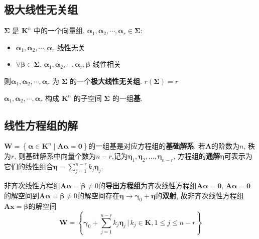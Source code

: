 \documentclass{article}
\begin{document}
		\subsection{极大线性无关组}
			$\boldsymbol{\Sigma}$ 是 $\mathbf{\mathbf{K}}^{n}$ 中的一个向量组, $\boldsymbol{\alpha}_{1}, \boldsymbol{\alpha}_{2}, \cdots, \boldsymbol{\alpha}_{r} \in \boldsymbol{\Sigma}$:
			\begin{itemize}
				\item $\boldsymbol{\alpha}_{1}, \boldsymbol{\alpha}_{2}, \cdots, \boldsymbol{\alpha}_{r}$ 线性无关
				\item $\forall\boldsymbol{\beta} \in \boldsymbol{\Sigma}$, $\boldsymbol{\alpha}_{1}, \boldsymbol{\alpha}_{2}, \cdots, \boldsymbol{\alpha}_{r}, \boldsymbol{\beta}$ 线性相关
			\end{itemize}
			则$\boldsymbol{\alpha}_{1}, \boldsymbol{\alpha}_{2}, \cdots, \boldsymbol{\alpha}_{r}$ 为 $\boldsymbol{\Sigma}$ 的一个\textbf{极大线性无关组}. $r(\boldsymbol{\Sigma})=r$

			$\boldsymbol{\alpha}_{1}, \boldsymbol{\alpha}_{2}, \cdots, \boldsymbol{\alpha}_{r}$ 构成 $\mathbf{\mathbf{K}}^{n}$ 的子空间 $\boldsymbol{\Sigma}$ 的一组\textbf{基}.
		\subsection{线性方程组的解}
			$\boldsymbol W=\left\{\boldsymbol{\alpha} \in \mathbf{\mathbf{K}}^{n} \mid \boldsymbol{A\alpha}=\mathbf{0}\right\}$的一组基是对应方程组的\textbf{基础解系}. 若$\boldsymbol A$的阶数为$n$, 秩为$r$, 则基础解系中向量个数为$n-r$,记为$\boldsymbol\eta _1,\boldsymbol\eta _2,\dots ,\boldsymbol\eta _{n-r}$, 方程组的\textbf{通解}$\boldsymbol\eta$可表示为它们的线性组合$\boldsymbol\eta =\sum \limits _{j=1}^{n-r} k_j\boldsymbol\eta _j$.

			非齐次线性方程组$\boldsymbol{A\alpha}=\boldsymbol{\beta}\neq 0$的\textbf{导出方程组}为齐次线性方程组$\boldsymbol{A\alpha}=\mathbf{0}$, $\boldsymbol{A\alpha}=\mathbf{0}$的解空间到$\boldsymbol{A\alpha}=\boldsymbol{\beta}\neq 0$的解空间存在$\boldsymbol\eta\rightarrow\boldsymbol\gamma_0+\boldsymbol\eta$的\textbf{双射}, 故非齐次线性方程组$\boldsymbol A\boldsymbol x=\boldsymbol\beta$的解空间
			$$
			\boldsymbol W=\left \{ \boldsymbol\gamma _0+\sum \limits _{j=1}^{n-r} k_j\boldsymbol\eta _j\, |\, k_j\in \mathbf{K},1\leqslant j\leqslant n-r \right \}
			$$
\end{document}

